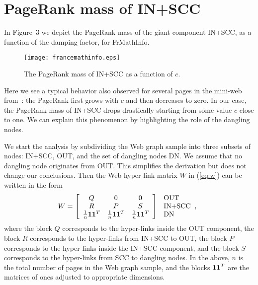 \documentclass{article}
\newcommand{\one}{{\bf 1}}
\newcommand{\onedn}{{\bf 1}}
\newcommand{\onescc}{{\bf 1}}
\newcommand{\oneout}{{\bf 1}}
\begin{document}
\section{PageRank mass of IN+SCC}
\label{sec:scc}

In Figure~3 we depict the PageRank mass of the giant component
IN+SCC, as a function of the damping factor, for FrMathInfo.
\begin{figure}
\centering
\texttt{[image: francemathinfo.eps]} \label{fig:in+scc}
\caption{The PageRank mass of IN+SCC as a function of $c$.}
\end{figure}
Here we see a typical behavior also observed for several pages in
the mini-web from~\cite{Boldi05}: the PageRank first grows with $c$
and then decreases to zero. In our case, the PageRank mass of IN+SCC
drops drastically starting from some value $c$ close to one. We can
explain this phenomenon by highlighting the role of the dangling
nodes.

We start the analysis by subdividing the Web graph sample into three
subsets of nodes: IN+SCC, OUT, and the set of dangling nodes DN. We
assume that no dangling node originates from OUT. This simplifies
the derivation but does not change our conclusions. Then the Web
hyper-link matrix $W$ in (\ref{eq:w}) can be written in the form
\[
W = \left[
\begin{array}{ccc}
Q & 0 & 0 \\
R & P & S \\
\frac{1}{n}\onedn\oneout^T & \frac{1}{n}\onedn\onescc^T &
\frac{1}{n}\onedn\onedn^T
\end{array} \right]\;
\begin{array}{l}\mbox{OUT}\\\mbox{IN+SCC\;\;,}\\\mbox{DN}
\end{array}
\]
where the block $Q$ corresponds to the hyper-links inside the OUT
component, the block $R$ corresponds to the hyper-links from IN+SCC
to OUT, the block $P$ corresponds to the hyper-links inside the
IN+SCC component, and the block $S$ corresponds to the hyper-links
from SCC to dangling nodes.  In the above, $n$ is the total number
of pages in the Web graph sample, and the blocks $\one\one^T$ are
the matrices of ones adjusted to appropriate dimensions.
\end{document}
